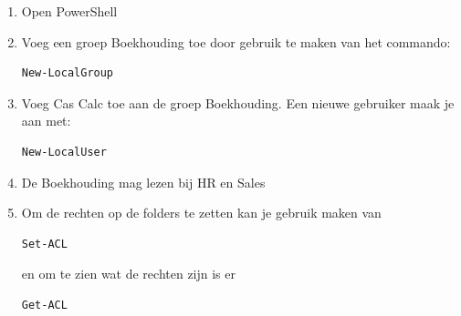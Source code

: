 \begin{enumerate}
\item Open PowerShell
\item Voeg een groep Boekhouding toe door gebruik te maken van het commando:
\begin{lstlisting}[language=bash]
New-LocalGroup
\end{lstlisting}
\item Voeg Cas Calc toe aan de groep Boekhouding. Een nieuwe gebruiker maak je aan met:
\begin{lstlisting}[language=bash]
New-LocalUser
\end{lstlisting}
\item De Boekhouding mag lezen bij HR en Sales
\item Om de rechten op de folders te zetten kan je gebruik maken van
\begin{lstlisting}[language=bash]
Set-ACL
\end{lstlisting}
en om te zien wat de rechten zijn is er
\begin{lstlisting}[language=bash]
Get-ACL
\end{lstlisting}
\end{enumerate}

